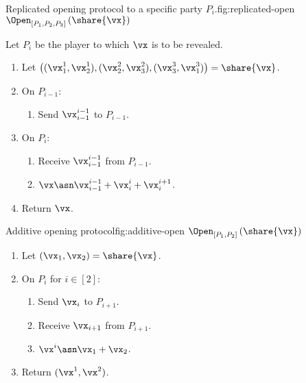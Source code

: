 \begin{Boxfig}{Replicated opening protocol to a specific party $P_i$.}{fig:replicated-open}
  {$\Open_{[P_1, P_2, P_3]} \left( \share{\vx} \right)$}
  
  Let $P_i$ be the player to which $\vx$ is to be revealed.
  
  \begin{enumerate}
  \item Let $\left( (\vx_1^1, \vx_2^1), (\vx_2^2, \vx_3^2), (\vx_3^3, \vx_1^3) \right) = \share{\vx}$.
  \item On $P_{i-1}$:
  \begin{enumerate}
    \item Send $\vx_{i-1}^{i-1}$ to $P_{i-1}$.
  \end{enumerate}
  \item On $P_i$:
  \begin{enumerate}
   \item Receive $\vx_{i-1}^{i-1}$ from $P_{i-1}$.
   \item $\vx \asn \vx_{i-1}^{i-1} + \vx_i^i + \vx_i^{i+1}$.
  \end{enumerate}
  \item Return $\vx$.
\end{enumerate}
\end{Boxfig}


\begin{Boxfig}{Additive opening protocol}{fig:additive-open}
  {$\Open_{[P_1, P_2]} \left( \share{\vx} \right)$}
  \begin{enumerate}
  \item Let $(\vx_1, \vx_2) = \share{\vx}$.
  \item On $P_i$ for $i \in [2]$:
  \begin{enumerate}
    \item Send $\vx_i$ to $P_{i+1}$.
    \item Receive $\vx_{i+1}$ from $P_{i+1}$.
    \item $\vx^i \asn \vx_1 + \vx_2$.
  \end{enumerate}
  \item Return $(\vx^1, \vx^2)$.
\end{enumerate}
\end{Boxfig}

